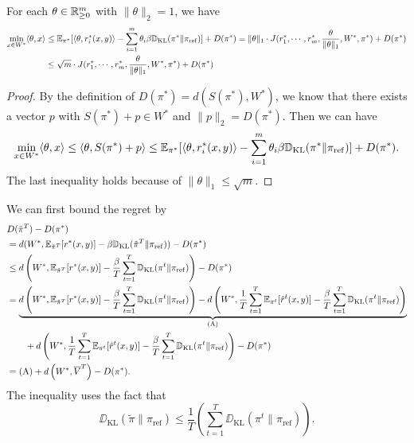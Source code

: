 \begin{lemma}\label{lemma:approach}
For each $\theta \in \mathbb{R}_{\ge0}^m$ with $\|\theta\|_2 = 1$, we have 
\begin{align*}\min_{x \in W^*}\langle \theta, x\rangle&\le  \mathbb{E}_{\pi^*}[\langle \theta, r_i^*(x,y)\rangle-\sum_{i=1}^m \theta_i\beta \mathbb{D}_{\mathrm{KL}}(\pi^*\|\pi_{\mathrm{ref}})] + D(\pi^*) = \|\theta\|_1\cdot J(r_1^*, \cdots, r_m^*, \frac{\theta}{\|\theta\|_1}, W^*, \pi^*) +  D(\pi^*)\\&\le\sqrt{m}\cdot J(r_1^*, \cdots, r_m^*, \frac{\theta}{\|\theta\|_1}, W^*, \pi^*) +  D(\pi^*) \end{align*}   
\end{lemma}
\begin{proof}
    By the definition of $D(\pi^*) = d(S(\pi^*), W^*)$, we know that there exists a vector $p$ with $S(\pi^*) + p \in W^*$ and $\|p\|_2 = D(\pi^*).$
Then we can have $$\min_{x \in W^*}\langle \theta, x\rangle \le \langle \theta, S(\pi^*) + p\rangle\le \mathbb{E}_{\pi^*}[\langle \theta, r_i^*(x,y)\rangle-\sum_{i=1}^m \theta_i\beta \mathbb{D}_{\mathrm{KL}}(\pi^*\|\pi_{\mathrm{ref}})] + D(\pi^*).$$
The last inequality holds because of $\|\theta\|_1 \le \sqrt{m}$.\end{proof}

We can first bound the regret by 
\begin{align}
    &D(\tilde{\pi}^T) - D(\pi^*) \nonumber\\ &= d(W^*, \mathbb{E}_{\tilde{\pi}^T}[r^*(x,y)]-\beta \mathbb{D}_{\mathrm{KL}}(\tilde{\pi}^T\| \pi_{\mathrm{ref}})) - D(\pi^*)\nonumber\\
    &\le d\left(W^*, \mathbb{E}_{\tilde{\pi}^T}[r^*(x,y)]-\frac{\beta}{T} \sum_{t=1}^T \mathbb{D}_{\mathrm{KL}}(\pi^t\|\pi_{\mathrm{ref}})\right) - D(\pi^*)\nonumber\\
    &= \underbrace{d\left(W^*, \mathbb{E}_{\tilde{\pi}^T}[r^*(x,y)]-\frac{\beta}{T} \sum_{t=1}^T \mathbb{D}_{\mathrm{KL}}(\pi^t\|\pi_{\mathrm{ref}})\right) - d\left(W^*, \frac{1}{T}\sum_{t=1}^T\mathbb{E}_{\pi^t}[\hat{r}^t(x,y)]-\frac{\beta}{T} \sum_{t=1}^T \mathbb{D}_{\mathrm{KL}}(\pi^t\|\pi_{\mathrm{ref}})\right)}_{\textrm{(A)}} \nonumber\\
    &\qquad + d\left(W^*, \frac{1}{T}\sum_{t=1}^T \mathbb{E}_{\pi^t}[\hat{r}^t(x,y)]-\frac{\beta}{T} \sum_{t=1}^T \mathbb{D}_{\mathrm{KL}}(\pi^t\|\pi_{\mathrm{ref}})\right) - D(\pi^*)\nonumber\\
    &=\mathrm{(A)}
    + d\left(W^*, \overline{V}^T\right) - D(\pi^*).\label{eq:finalregret_key}
\end{align}
The inequality uses the fact that 
$$\DD_{\mathrm{KL}}(\tilde{\pi}\| \pi_{\mathrm{ref}}) \le \frac{1}{T}\left(\sum_{t=1}^T\DD_{\mathrm{KL}}(\pi^t \| \pi_{\mathrm{ref}})\right).$$


